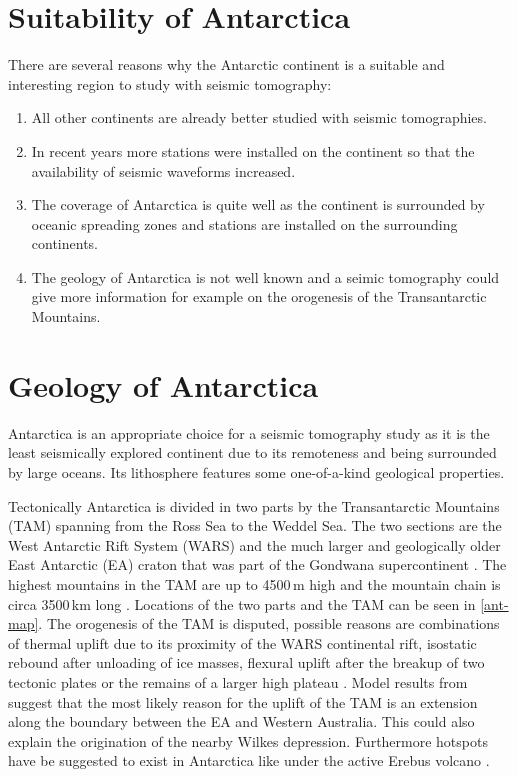 \section{Suitability of Antarctica}

There are several reasons why the Antarctic continent is a suitable and interesting region 
to study with seismic tomography:
\begin{enumerate}[i]
\item All other continents are already better studied with seismic tomographies.
\item In recent years more stations were installed on the continent so that the availability 
of seismic waveforms increased.
\item The coverage of Antarctica is quite well as the continent is surrounded by oceanic spreading zones 
and stations are installed on the surrounding continents.
\item The geology of Antarctica is not well known and a seimic tomography could give more information
for example on the orogenesis of the Transantarctic Mountains.
\end{enumerate}


\section{Geology of Antarctica}
Antarctica is an appropriate choice for a seismic tomography study as it is the least seismically explored continent 
due to its remoteness and being surrounded by large oceans. 
Its lithosphere features some one-of-a-kind geological properties. 

Tectonically Antarctica is divided in two parts by the Transantarctic Mountains (TAM) spanning from the Ross Sea to the Weddel Sea.
The two sections are the West Antarctic Rift System (WARS) and the much larger and geologically older East Antarctic (EA) craton that 
was part of the Gondwana supercontinent \citep{Gupta2009}. 
The highest mountains in the TAM are up to 4500$\,$m high and the mountain chain is circa 3500$\,$km long \citep{Morelli2004}.
Locations of the two parts and the TAM can be seen in \autoref{ant-map}.
The orogenesis %
of the TAM is disputed, possible reasons are combinations of thermal uplift due to its proximity of the WARS continental rift, 
isostatic rebound after unloading of ice masses, flexural uplift after the breakup of two tectonic plates or 
the remains of a larger high plateau \citep{VanWijk2008}.
Model results from \citealp{VanWijk2008} suggest that the most likely reason for the uplift of the TAM is an extension along the 
boundary between the EA and Western Australia. This could also explain the origination of the nearby Wilkes depression.
Furthermore hotspots have be suggested to exist in Antarctica like under the active Erebus volcano \citep{Gupta2009}.

